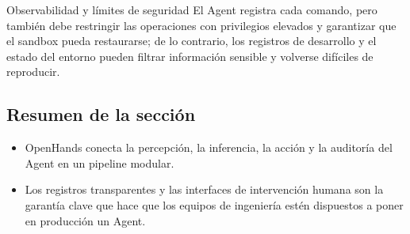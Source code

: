 \begin{warningbox}{Observabilidad y límites de seguridad}
El Agent registra cada comando, pero también debe restringir las operaciones con privilegios elevados y garantizar que el sandbox pueda restaurarse; de lo contrario, los registros de desarrollo y el estado del entorno pueden filtrar información sensible y volverse difíciles de reproducir.
\end{warningbox}

\subsection{Resumen de la sección}
\begin{itemize}
    \item OpenHands conecta la percepción, la inferencia, la acción y la auditoría del Agent en un pipeline modular.
    \item Los registros transparentes y las interfaces de intervención humana son la garantía clave que hace que los equipos de ingeniería estén dispuestos a poner en producción un Agent.
\end{itemize}
